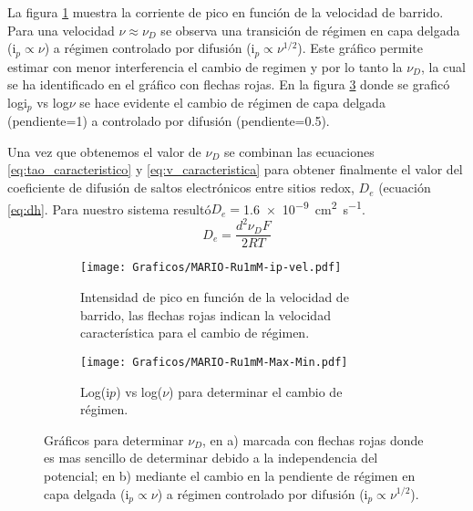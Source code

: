         La figura \ref{fig:ip-vel} muestra la corriente de pico en función de la velocidad de barrido. Para una velocidad $\nu \approx \nu_{\scriptscriptstyle{D}}$ se observa una transición de régimen en capa delgada ($\text{i}_{p} \propto \nu$) a régimen controlado por difusión ($\text{i}_{p} \propto \nu^{1/2}$).	Este gráfico permite estimar con menor interferencia el cambio de regimen y por lo tanto la $\nu_{\scriptscriptstyle{D}}$, la cual se ha identificado en el gráfico con flechas rojas. En la figura \ref{fig:ip-vel2} donde se graficó log{i$_p$} vs log{$\nu$} se hace evidente el cambio de régimen de capa delgada (pendiente=1) a controlado por difusión (pendiente=0.5).

		 Una vez que obtenemos el valor de  $\nu_{\scriptscriptstyle{D}}$ se combinan las ecuaciones \ref{eq:tao_caracteristico} y \ref{eq:v_caracteristica} para obtener finalmente el valor del coeficiente de difusión de saltos electrónicos entre sitios redox,  $D_e$ (ecuación \ref{eq:dh}. Para nuestro sistema resultó\hfill\linebreak$D_e=$\SI{1.6e-9}{\square\cm\per\second}.  
			\begin{equation}
					D_e= \frac{d^2\nu_{\scriptscriptstyle{D}}F}{2RT}
					\label{eq:dh}
			\end{equation}
            \begin{figure}[ht]
			  \begin{subfigure}[t]{0.495\textwidth}
			  \texttt{[image: Graficos/MARIO-Ru1mM-ip-vel.pdf]}
			  \caption{Intensidad de pico  en función de la velocidad de barrido, las flechas rojas indican la velocidad característica para el cambio de régimen.}
			  \label{fig:ip-vel}
		  	 \end{subfigure}	
			 \begin{subfigure}[t]{0.495\textwidth}
			  \texttt{[image: Graficos/MARIO-Ru1mM-Max-Min.pdf]}
			  \caption{Log(i$p$) vs log($\nu$) para determinar el cambio de régimen.}
			  \label{fig:logj-logv}
		  	 \end{subfigure}
			  \caption[Calculo de velocidad de barrido característica]{Gráficos para determinar $\nu_{\scriptscriptstyle{D}}$, en a) marcada con flechas rojas donde es mas sencillo de determinar debido a la independencia del potencial; en b) mediante el cambio en la pendiente de  régimen en capa delgada ($\text{i}_{p} \propto \nu$) a régimen controlado por difusión ($\text{i}_{p} \propto \nu^{1/2}$).}
			  \label{fig:ip-vel2}
			  \end{figure}
	 
